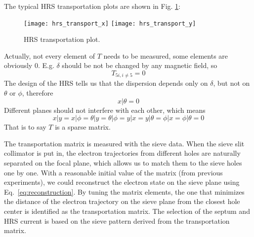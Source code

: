 The typical HRS transportation plots are shown in Fig. \ref{fig:hrs_transport}:
\begin{figure}[!h]
    \texttt{[image: hrs\_transport\_x]}
    \texttt{[image: hrs\_transport\_y]}
    \caption{HRS transportation plot. 
    } %
    \label{fig:hrs_transport}
\end{figure}

Actually, not every element of $T$ needs to be measured, some elements are obviously
0. E.g. $\delta$ should be not be changed by any magnetic field, so 
\begin{equation}
    T_{5i, i\ne 5} = 0
\end{equation}
The design of the HRS tells us that the dispersion depends only on $\delta$, but not
on $\theta$ or $\phi$, therefore 
\begin{equation}
    x|\theta = 0
\end{equation}
Different planes should not interfere with each other, which means 
\begin{equation}
    x|y = x|\phi = \theta|y = \theta|\phi = y|x = y|\theta = \phi|x = \phi|\theta = 0
\end{equation}
That is to say $T$ is a sparse matrix.

The transportation matrix is measured with the sieve data. 
When the sieve slit collimator is put in, the electron trajectories
from different holes are naturally separated on the focal plane, which allows
us to match them to the sieve holes one by one. With a reasonable initial value of 
the matrix (from previous experiments),
we could reconstruct the electron state on the sieve plane using Eq.~\ref{eq:reconstruction}.
By tuning the matrix elements, the one that minimizes the distance of the 
electron trajectory on the sieve plane from the closest hole center 
is identified as the transportation matrix. %
The selection of the septum and HRS current is based on the sieve pattern 
derived from the transportation matrix. 


